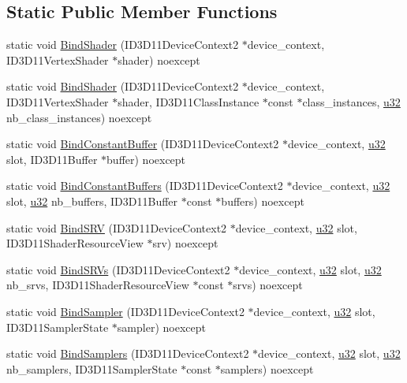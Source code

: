\subsection*{Static Public Member Functions}
\begin{DoxyCompactItemize}
\item 
static void \hyperlink{structmage_1_1_pipeline_1_1_v_s_a2e3388f0211879d1592979aab999e0a4}{Bind\+Shader} (I\+D3\+D11\+Device\+Context2 $\ast$device\+\_\+context, I\+D3\+D11\+Vertex\+Shader $\ast$shader) noexcept
\item 
static void \hyperlink{structmage_1_1_pipeline_1_1_v_s_a86013c6ecc69b4f4087194c81132f74e}{Bind\+Shader} (I\+D3\+D11\+Device\+Context2 $\ast$device\+\_\+context, I\+D3\+D11\+Vertex\+Shader $\ast$shader, I\+D3\+D11\+Class\+Instance $\ast$const $\ast$class\+\_\+instances, \hyperlink{namespacemage_af2b398bf98eb10351f49cad73fe2cc73}{u32} nb\+\_\+class\+\_\+instances) noexcept
\item 
static void \hyperlink{structmage_1_1_pipeline_1_1_v_s_a60f13e8e0580732d10308222b30e333d}{Bind\+Constant\+Buffer} (I\+D3\+D11\+Device\+Context2 $\ast$device\+\_\+context, \hyperlink{namespacemage_af2b398bf98eb10351f49cad73fe2cc73}{u32} slot, I\+D3\+D11\+Buffer $\ast$buffer) noexcept
\item 
static void \hyperlink{structmage_1_1_pipeline_1_1_v_s_a1b80e745a13710124a5dc496fe3e75b6}{Bind\+Constant\+Buffers} (I\+D3\+D11\+Device\+Context2 $\ast$device\+\_\+context, \hyperlink{namespacemage_af2b398bf98eb10351f49cad73fe2cc73}{u32} slot, \hyperlink{namespacemage_af2b398bf98eb10351f49cad73fe2cc73}{u32} nb\+\_\+buffers, I\+D3\+D11\+Buffer $\ast$const $\ast$buffers) noexcept
\item 
static void \hyperlink{structmage_1_1_pipeline_1_1_v_s_a1138b56de58fa01dbbbdd4d79c92eea2}{Bind\+S\+RV} (I\+D3\+D11\+Device\+Context2 $\ast$device\+\_\+context, \hyperlink{namespacemage_af2b398bf98eb10351f49cad73fe2cc73}{u32} slot, I\+D3\+D11\+Shader\+Resource\+View $\ast$srv) noexcept
\item 
static void \hyperlink{structmage_1_1_pipeline_1_1_v_s_aec22edcfadc64869d853f4c7171a8781}{Bind\+S\+R\+Vs} (I\+D3\+D11\+Device\+Context2 $\ast$device\+\_\+context, \hyperlink{namespacemage_af2b398bf98eb10351f49cad73fe2cc73}{u32} slot, \hyperlink{namespacemage_af2b398bf98eb10351f49cad73fe2cc73}{u32} nb\+\_\+srvs, I\+D3\+D11\+Shader\+Resource\+View $\ast$const $\ast$srvs) noexcept
\item 
static void \hyperlink{structmage_1_1_pipeline_1_1_v_s_a3771cd97a8b7de46c6c456d8d72cab15}{Bind\+Sampler} (I\+D3\+D11\+Device\+Context2 $\ast$device\+\_\+context, \hyperlink{namespacemage_af2b398bf98eb10351f49cad73fe2cc73}{u32} slot, I\+D3\+D11\+Sampler\+State $\ast$sampler) noexcept
\item 
static void \hyperlink{structmage_1_1_pipeline_1_1_v_s_af8ada26a2f212d3d4fb6ec3f5237629d}{Bind\+Samplers} (I\+D3\+D11\+Device\+Context2 $\ast$device\+\_\+context, \hyperlink{namespacemage_af2b398bf98eb10351f49cad73fe2cc73}{u32} slot, \hyperlink{namespacemage_af2b398bf98eb10351f49cad73fe2cc73}{u32} nb\+\_\+samplers, I\+D3\+D11\+Sampler\+State $\ast$const $\ast$samplers) noexcept
\end{DoxyCompactItemize}
